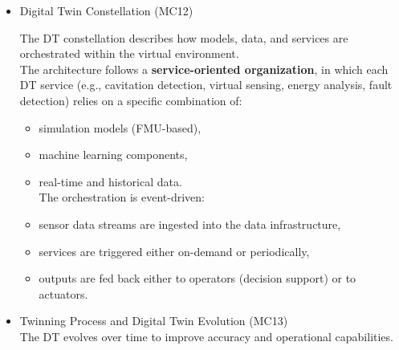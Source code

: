 \documentclass[
]{article}
\providecommand{\tightlist}{%
  \setlength{\itemsep}{0pt}\setlength{\parskip}{0pt}}
\begin{document}
\begin{itemize}
\begin{itemize}
\begin{itemize}
\begin{itemize}
\begin{itemize}
          Web application interface for visualization and interaction.\\
          These enablers collectively ensure data acquisition, model
          execution, orchestration, and user interaction.
        \end{itemize}
      \item
        Digital Twin Constellation (MC12)

        The DT constellation describes how models, data, and services
        are orchestrated within the virtual environment.\\
        The architecture follows a \textbf{service-oriented
        organization}, in which each DT service (e.g., cavitation
        detection, virtual sensing, energy analysis, fault detection)
        relies on a specific combination of:

        \begin{itemize}
        \tightlist
        \item
          simulation models (FMU-based),
        \item
          machine learning components,
        \item
          real-time and historical data.\\
          The orchestration is event-driven:
        \item
          sensor data streams are ingested into the data infrastructure,
        \item
          services are triggered either on-demand or periodically,
        \item
          outputs are fed back either to operators (decision support) or
          to actuators.
        \end{itemize}
      \item
        Twinning Process and Digital Twin Evolution (MC13)\\
        The DT evolves over time to improve accuracy and operational
        capabilities.


\end{itemize}
\end{itemize}
\end{itemize}
\end{itemize}
\end{document}
